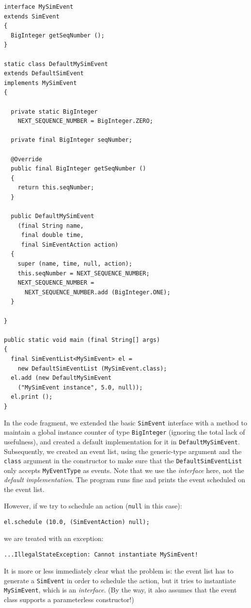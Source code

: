 \documentclass[12pt]{book}
\begin{document}
\begin{lstlisting}[basicstyle=\footnotesize]
interface MySimEvent
extends SimEvent
{
  BigInteger getSeqNumber ();
}
  
static class DefaultMySimEvent
extends DefaultSimEvent
implements MySimEvent
{

  private static BigInteger
    NEXT_SEQUENCE_NUMBER = BigInteger.ZERO;
  
  private final BigInteger seqNumber;
  
  @Override
  public final BigInteger getSeqNumber ()
  {
    return this.seqNumber;
  }

  public DefaultMySimEvent
    (final String name,
     final double time,
     final SimEventAction action)
  {
    super (name, time, null, action);
    this.seqNumber = NEXT_SEQUENCE_NUMBER;
    NEXT_SEQUENCE_NUMBER =
      NEXT_SEQUENCE_NUMBER.add (BigInteger.ONE);
  }
  
}
  
public static void main (final String[] args)
{
  final SimEventList<MySimEvent> el =
    new DefaultSimEventList (MySimEvent.class);
  el.add (new DefaultMySimEvent
    ("MySimEvent instance", 5.0, null));
  el.print ();
}
\end{lstlisting}

In the code fragment, we extended the basic \lstinline{SimEvent}
  interface with a method to
  maintain a global instance counter
  of type \lstinline|BigInteger|
  (ignoring the total lack of usefulness),
  and created a default implementation for it
  in \lstinline|DefaultMySimEvent|.
Subsequently, we created an event list,
  using the generic-type argument and
  the \lstinline|class| argument in the constructor
  to make sure that the \lstinline-DefaultSimEventList-
  only accepts \lstinline-MyEventType- as
  events.
Note that we use the {\em interface\/} here,
  not the {\em default implementation}.
The program runs fine and prints the event
  scheduled on the event list.

However, if we try to schedule an action
  (\lstinline|null| in this case):
\begin{lstlisting}[basicstyle=\footnotesize]
  el.schedule (10.0, (SimEventAction) null);
\end{lstlisting}
we are treated with an exception:
\begin{lstlisting}[basicstyle=\footnotesize]
...IllegalStateException: Cannot instantiate MySimEvent!
\end{lstlisting}
It is more or less immediately clear what the problem is:
  the event list has to generate a \lstinline|SimEvent|
  in order to schedule the action,
  but it tries to instantiate \lstinline|MySimEvent|,
  which is an {\em interface\/}.
(By the way, it also assumes that the event class
  supports a parameterless constructor!)
\end{document}
